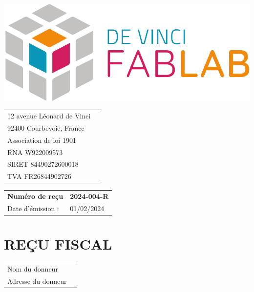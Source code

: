 \documentclass[11pt,a4paper]{article}
\begin{document}
\thispagestyle{empty}


\begin{minipage}{0.4\textwidth}
    \includegraphics[width=0.7\linewidth]{../../assets/logo_fablab.png}

    \vspace{0.5cm}

    \begin{tabular}{ll}
        12 avenue Léonard de Vinci \\
        92400 Courbevoie, France   \\
        Association de loi 1901    \\
        RNA W922009573             \\
        SIRET 84490272600018       \\
        TVA  FR26844902726         \\
    \end{tabular}
\end{minipage}\begin{minipage}{0.6\textwidth}
    \begin{flushright}
        \begin{tabular}{ll}
            \textbf{Numéro de reçu} & \textbf{2024-004-R} \\
            Date d'émission :       & 01/02/2024          \\
        \end{tabular}
    \end{flushright}
\end{minipage}

\begin{minipage}[t]{0.5\textwidth}
    \hspace*{0pt}\vspace*{\fill}
    \section*{\LARGE REÇU FISCAL}
\end{minipage}\begin{minipage}[t]{0.5\textwidth}
    \begin{framed}
        \begin{tabular}{ll}
            Nom du donneur     \\
            Adresse du donneur \\
        \end{tabular}
    \end{framed}
    \vspace{0.1cm}
\end{minipage}
\end{document}
